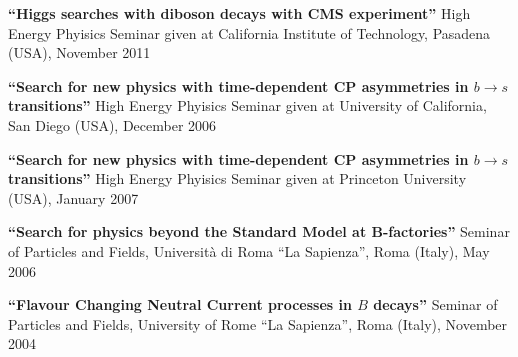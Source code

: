   {\bf ``Higgs searches with diboson decays with CMS experiment''}
  High Energy Phyisics Seminar given at California Institute of Technology, Pasadena (USA), November 2011

  {\bf ``Search for new physics with time-dependent CP asymmetries in $b\to s$ transitions''}
  High Energy Phyisics Seminar given at University of California, San Diego (USA), December 2006

  {\bf ``Search for new physics with time-dependent CP asymmetries in $b\to s$ transitions''}
  High Energy Phyisics Seminar given at Princeton University (USA), January 2007

  {\bf ``Search for physics beyond the Standard Model at B-factories''}
  Seminar of Particles and Fields,  Universit\`a di Roma ``La Sapienza'', Roma (Italy), May 2006
  \vspace{3mm}

  {\bf ``Flavour Changing Neutral Current processes in $B$ decays''}
  Seminar of Particles and Fields, University of Rome ``La Sapienza'', Roma (Italy), November 2004
  \vspace{3mm}
